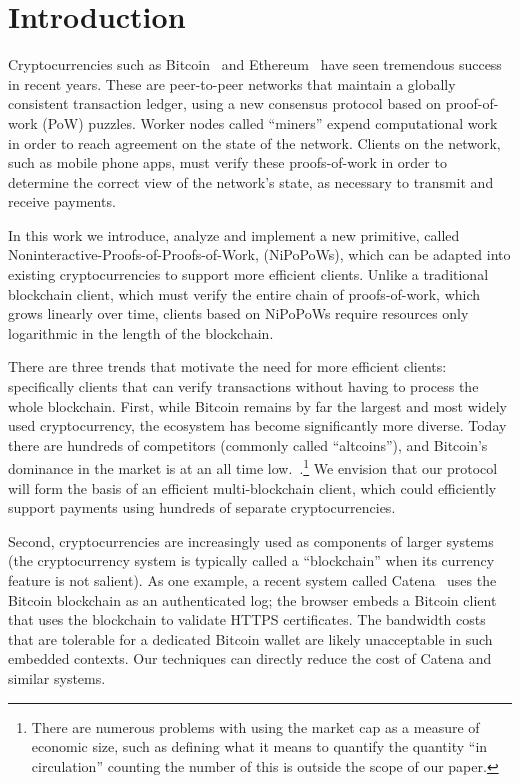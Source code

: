 \section{Introduction}
Cryptocurrencies such as Bitcoin~\cite{bitcoin} and Ethereum~\cite{ethereum} have seen tremendous success in recent years.
These are peer-to-peer networks that maintain a globally consistent transaction ledger, using a new consensus protocol based on proof-of-work (PoW) puzzles. Worker nodes called ``miners'' expend computational work in order to reach agreement on the state of the network.
Clients on the network, such as mobile phone apps, must verify these proofs-of-work in order to determine the correct view of the network's state, as necessary to transmit and receive payments.

In this work we introduce, analyze and implement  a new primitive, called Noninteractive-Proofs-of-Proofs-of-Work, (NiPoPoWs), which can be adapted into existing cryptocurrencies to support more efficient clients.
Unlike a traditional blockchain client, which must verify the entire chain of proofs-of-work, which grows linearly over time, clients based on NiPoPoWs require resources only logarithmic in the length of the blockchain.

There are three trends that motivate the need for more efficient clients: specifically clients that can verify transactions without having to process the whole blockchain.
First, while Bitcoin remains by far the largest and most widely used cryptocurrency, the ecosystem has become significantly more diverse. Today there are hundreds of competitors (commonly called ``altcoins''), and Bitcoin's dominance in the market is at an all time low.~\cite{marketcap}.\footnote{There are numerous problems with using the market cap as a measure of economic size, such as defining what it means to quantify the quantity ``in circulation'' counting the number of this is outside the scope of our paper.}
  We envision that our protocol will form the basis of an efficient multi-blockchain client, which could efficiently support payments using hundreds of separate cryptocurrencies.

  Second, cryptocurrencies are increasingly used as components of larger systems (the cryptocurrency system is typically called a ``blockchain'' when its currency feature is not salient).
  As one example, a recent system called Catena~\cite{catena} uses the Bitcoin blockchain as an authenticated log; the browser embeds a Bitcoin client that uses the blockchain to validate HTTPS certificates.
  The bandwidth costs that are tolerable for a dedicated Bitcoin wallet are likely unacceptable in such embedded contexts. Our techniques can directly reduce the cost of Catena and similar systems.

